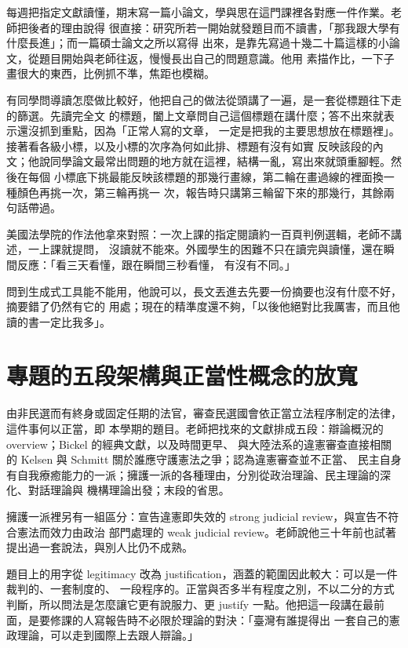 每週把指定文獻讀懂，期末寫一篇小論文，學與思在這門課裡各對應一件作業。老師把後者的理由說得
很直接：研究所若一開始就發題目而不讀書，「那我跟大學有什麼長進」；而一篇碩士論文之所以寫得
出來，是靠先寫過十幾二十篇這樣的小論文，從題目開始與老師往返，慢慢長出自己的問題意識。他用
素描作比，一下子畫很大的東西，比例抓不準，焦距也模糊。

有同學問導讀怎麼做比較好，他把自己的做法從頭講了一遍，是一套從標題往下走的篩選。先讀完全文
的標題，闔上文章問自己這個標題在講什麼；答不出來就表示還沒抓到重點，因為「正常人寫的文章，
一定是把我的主要思想放在標題裡」。接著看各級小標，以及小標的次序為何如此排、標題有沒有如實
反映該段的內文；他說同學論文最常出問題的地方就在這裡，結構一亂，寫出來就頭重腳輕。然後在每個
小標底下挑最能反映該標題的那幾行畫線，第二輪在畫過線的裡面換一種顏色再挑一次，第三輪再挑一
次，報告時只講第三輪留下來的那幾行，其餘兩句話帶過。

美國法學院的作法他拿來對照：一次上課的指定閱讀約一百頁判例選輯，老師不講述，一上課就提問，
沒讀就不能來。外國學生的困難不只在讀完與讀懂，還在瞬間反應：「看三天看懂，跟在瞬間三秒看懂，
有沒有不同。」

問到生成式工具能不能用，他說可以，長文丟進去先要一份摘要也沒有什麼不好，摘要錯了仍然有它的
用處；現在的精準度還不夠，「以後他絕對比我厲害，而且他讀的書一定比我多」。

\section{專題的五段架構與正當性概念的放寬}

由非民選而有終身或固定任期的法官，審查民選國會依正當立法程序制定的法律，這件事何以正當，即
本學期的題目。老師把找來的文獻排成五段：辯論概況的 overview；Bickel 的經典文獻，以及時間更早、
與大陸法系的違憲審查直接相關的 Kelsen 與 Schmitt 關於誰應守護憲法之爭；認為違憲審查並不正當、
民主自身有自我療癒能力的一派；擁護一派的各種理由，分別從政治理論、民主理論的深化、對話理論與
機構理論出發；末段的省思。

擁護一派裡另有一組區分：宣告違憲即失效的 strong judicial review，與宣告不符合憲法而效力由政治
部門處理的 weak judicial review。老師說他三十年前也試著提出過一套說法，與別人比仍不成熟。

題目上的用字從 legitimacy 改為 justification，涵蓋的範圍因此較大：可以是一件裁判的、一套制度的、
一段程序的。正當與否多半有程度之別，不以二分的方式判斷，所以問法是怎麼讓它更有說服力、更
justify 一點。他把這一段講在最前面，是要修課的人寫報告時不必限於理論的對決：「臺灣有誰提得出
一套自己的憲政理論，可以走到國際上去跟人辯論。」

